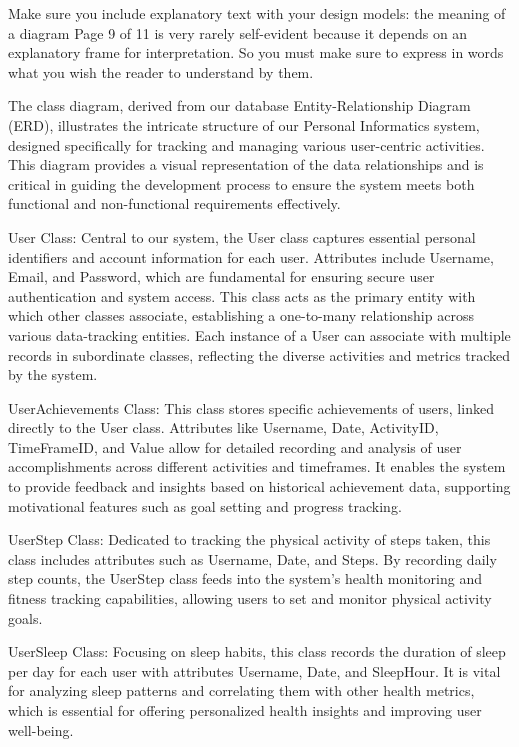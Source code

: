 \documentclass[12pt]{article}
\begin{document}
Make sure you include explanatory text with your design models: the meaning of a diagram
Page 9 of 11
is very rarely self-evident because it depends on an explanatory frame for interpretation. So
you must make sure to express in words what you wish the reader to understand by them.


The class diagram, derived from our database Entity-Relationship Diagram (ERD), illustrates the intricate structure of our Personal Informatics system, designed specifically for tracking and managing various user-centric activities. This diagram provides a visual representation of the data relationships and is critical in guiding the development process to ensure the system meets both functional and non-functional requirements effectively.\par

User Class: Central to our system, the User class captures essential personal identifiers and account information for each user. Attributes include Username, Email, and Password, which are fundamental for ensuring secure user authentication and system access. This class acts as the primary entity with which other classes associate, establishing a one-to-many relationship across various data-tracking entities. Each instance of a User can associate with multiple records in subordinate classes, reflecting the diverse activities and metrics tracked by the system.\par

UserAchievements Class: This class stores specific achievements of users, linked directly to the User class. Attributes like Username, Date, ActivityID, TimeFrameID, and Value allow for detailed recording and analysis of user accomplishments across different activities and timeframes. It enables the system to provide feedback and insights based on historical achievement data, supporting motivational features such as goal setting and progress tracking.\par

UserStep Class: Dedicated to tracking the physical activity of steps taken, this class includes attributes such as Username, Date, and Steps. By recording daily step counts, the UserStep class feeds into the system’s health monitoring and fitness tracking capabilities, allowing users to set and monitor physical activity goals.\par

UserSleep Class: Focusing on sleep habits, this class records the duration of sleep per day for each user with attributes Username, Date, and SleepHour. It is vital for analyzing sleep patterns and correlating them with other health metrics, which is essential for offering personalized health insights and improving user well-being.\par
\end{document}
